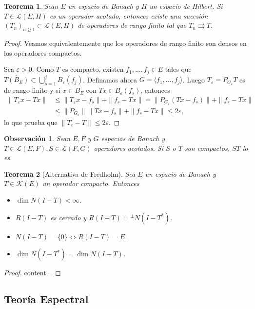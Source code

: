 \documentclass[11pt]{report}
\theoremstyle{colored}
\newtheorem{theorem}{Teorema}[section]
\newtheorem{remark}{Observación}[section]
\newcommand{\eps}{\varepsilon}
\begin{document}
\begin{theorem} Sean $E$ un espacio de Banach y $H$ un espacio de Hilbert. Si $T \in \mathscr{L}(E,H)$ es un operador acotado, entonces existe una sucesión $(T_n)_{n \geq 1} \subset  \mathscr{L}(E,H)$ de operadores de rango finito tal que $T_n \rightrightarrows T$.
\end{theorem}
\begin{proof} Veamos equivalentemente que los operadores de rango finito son densos en los operadores compactos.

Sea $\eps > 0$. Como $T$ es compacto, existen $f_1, \dots, f_j \in E$ tales que
$\overline{T(B_E)} \subset \bigcup_{s=1}^jB_\eps(f_j)$. Definamos ahora $G = \langle f_1, \dots, f_j \rangle$. Luego $T_\eps = P_{G_\eps}T$ es de rango finito y si $x \in B_E$ con $Tx \in B_\eps(f_s)$, entonces 
\begin{align*}
\|T_\eps x - Tx\| &\leq \|T_\eps x - f_s\| + \|f_s -Tx\| = \|P_{G_\eps}(Tx - f_s)\| + \|f_s -Tx\|\\
&\leq \|P_{G_\eps}\|\|Tx - f_s\| + \|f_s - Tx\| \leq 2\eps,
\end{align*}
lo que prueba que $\|T_\eps -T\| \leq 2\eps$.
\end{proof}

\begin{remark} Sean $E,F$ y $G$ espacios de Banach y $T \in \mathscr{L}(E,F), S \in \mathscr{L}(F,G)$ operadores acotados. Si $S$ o $T$ son compactos, $ST$ lo es.
\end{remark}

\begin{theorem}[Alternativa de Fredholm] Sea $E$ un espacio de Banach y $T \in \mathscr{K}(E)$ un operador compacto. Entonces
\begin{itemize}
\item[(a)] $\dim N(I-T) < \infty$.
\item[(b)] $R(I-T)$ es cerrado y $R(I-T) = {}^\perp N(I-T^*)$.
\item[(c)] $N(I-T) = \{0\} \iff R(I-T) = E$.
\item[(d)] $\dim N(I-T^*) = \dim N(I-T)$.
\end{itemize} 
\end{theorem}
\begin{proof}
content...
\end{proof}

\subsection{Teoría Espectral}
\end{document}
